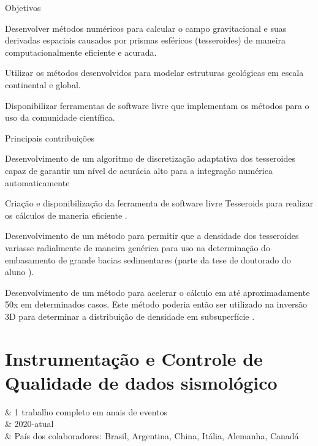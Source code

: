 \documentclass[10pt,a4paper,oneside]{book}
\begin{document}
\begin{fancyenum}{\faBullseye}{Objetivos}
  \item Desenvolver métodos numéricos para calcular o campo gravitacional e suas derivadas espaciais causados por prismas esféricos (tesseroides) de maneira computacionalmente eficiente e acurada.
  \item Utilizar os métodos desenvolvidos para modelar estruturas geológicas em escala continental e global.
  \item Disponibilizar ferramentas de software livre que implementam os métodos para o uso da comunidade científica.
\end{fancyenum}

\begin{fancyenum}{\faLightbulb}{Principais contribuições}
  \item Desenvolvimento de um algoritmo de discretização adaptativa dos tesseroides capaz de garantir um nível de acurácia alto para a integração numérica automaticamente 
  \item Criação e disponibilização da ferramenta de software livre Tesseroids para realizar os cálculos de maneria eficiente \citep{Uieda2016}.
  \item Desenvolvimento de um método para permitir que a densidade dos tesseroides variasse radialmente de maneira genérica \citep{Soler2019} para uso na determinação do embasamento de grande bacias sedimentares (parte da tese de doutorado do aluno \SantiagoLink{}).
  \item Desenvolvimento de um método para acelerar o cálculo em até aproximadamente 50x em determinados casos. Este método poderia então ser utilizado na inversão 3D para determinar a distribuição de densidade em subsuperfície \citep[][em colaboração com pesquisadores da Central South University, China, e GFZ Potsdam, Alemanha]{Zhao2019}.
\end{fancyenum}

\section{Instrumentação e Controle de Qualidade de dados sismológico}
\label{sec_inst_qc}

\begin{summarybox}[frametitle=\faInfoCircle{}\quad Resumo da linha de pesquisa]
	\begin{fa-ul}
		\faBriefcase & 1 trabalho completo em anais de eventos \\
		\faBicycle & 2020-atual \\
		\faBullhorn & País dos colaboradores: Brasil, Argentina, China, Itália, Alemanha, Canadá
	\end{fa-ul}
\end{summarybox}
\end{document}
